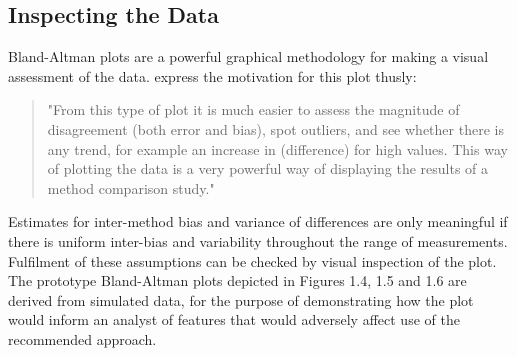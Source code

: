 \documentclass[12pt, a4paper]{report}
\theoremstyle{plain}
\theoremstyle{definition}
\theoremstyle{remark}
\begin{document}
	\newpage
	
	
	
	
	
	
	
	


	\subsection{Inspecting the Data}
	Bland-Altman plots are a powerful graphical methodology for making
	a visual assessment of the data. \citet*{BA83} express the
	motivation for this plot thusly:
	\begin{quote}
		"From this type of plot it is much easier to assess the magnitude
		of disagreement (both error and bias), spot outliers, and see
		whether there is any trend, for example an increase in
		(difference) for high values. This way of plotting the data is a
		very powerful way of displaying the results of a method comparison
		study."
	\end{quote}
Estimates for inter-method bias and variance of differences are only meaningful if there is uniform inter-bias and variability throughout the range of measurements. Fulfilment of these assumptions can be checked by visual inspection of the plot. The prototype Bland-Altman plots depicted in Figures 1.4, 1.5 and 1.6 are derived from simulated data, for the purpose of demonstrating how the plot would inform an analyst of features that would adversely affect use of the recommended approach.
	
\end{document}
